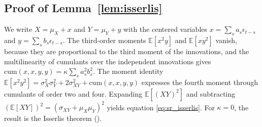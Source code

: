 \documentclass[hidelinks]{siamonline250211}
\begin{document}
\subsection{Proof of Lemma~\ref{lem:isserlis}}\label{sec:isserlis}

We write $X=\mu_{X}+x$ and $Y=\mu_{Y}+y$ with the centered variables $x=\sum_{s}a_{s}\epsilon_{t-s}$ and $y=\sum_{s}b_{s}\epsilon_{t-s}$. The third-order moments $\mathbb{E}[x^{2}y]$ and $\mathbb{E}[xy^{2}]$ vanish, because they are proportional to the third moment of the innovations, and the multilinearity of cumulants over the independent innovations gives $\mathrm{cum}\left(x,x,y,y\right)=\kappa\sum_{s}a^{2}_{s}b^{2}_{s}$. The moment identity $\mathbb{E}[x^{2}y^{2}]=\sigma^{2}_{X}\sigma^{2}_{Y}+2\sigma^{2}_{XY}+\mathrm{cum}\left(x,x,y,y\right)$ expresses the fourth moment through cumulants of order two and four. Expanding $\mathbb{E}[(XY)^{2}]$ and subtracting $\left(\mathbb{E}[XY]\right)^{2}=\left(\sigma_{XY}+\mu_{X}\mu_{Y}\right)^{2}$ yields equation \eqref{eq:sr_isserlis}. For $\kappa=0$, the result is the Isserlis theorem (\cite{Isserlis1918}).
\end{document}
